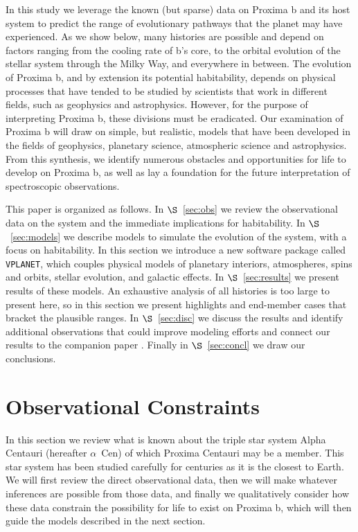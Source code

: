 \documentclass[preprint,12pt]{aastex}
\def\acen{{$\alpha$~Cen}}
\def\vplanet{\texttt{\footnotesize{VPLANET}}}
\begin{document}
In this study we leverage the known (but sparse) data on Proxima b and
its host system to predict the range of evolutionary pathways that the
planet may have experienced. As we show below, many histories are
possible and depend on factors ranging from the cooling rate of b's
core, to the orbital evolution of the stellar system through the Milky
Way, and everywhere in between. The evolution of Proxima b, and by
extension its potential habitability, depends on physical processes
that have tended to be studied by scientists that work in different
fields, such as geophysics and astrophysics. However, for the purpose
of interpreting Proxima b, these divisions must be eradicated. Our
examination of Proxima b will draw on simple, but realistic, models
that have been developed in the fields of geophysics, planetary
science, atmospheric science and astrophysics. From this synthesis, we
identify numerous obstacles and opportunities for life to develop on
Proxima b, as well as lay a foundation for the future interpretation
of spectroscopic observations.

This paper is organized as follows. In $\S$~\ref{sec:obs} we review
the observational data on the system and the immediate implications
for habitability. In $\S$~\ref{sec:models} we describe models to
simulate the evolution of the system, with a focus on habitability. In
this section we introduce a new software package called \vplanet,
which couples physical models of planetary interiors, atmospheres,
spins and orbits, stellar evolution, and galactic effects. In
$\S$~\ref{sec:results} we present results of these models. An
exhaustive analysis of all histories is too large to present here, so
in this section we present highlights and end-member cases that
bracket the plausible ranges. In $\S$~\ref{sec:disc} we discuss the
results and identify additional observations that could improve
modeling efforts and connect our results to the companion paper
\citep{Meadows16}. Finally in $\S$~\ref{sec:concl} we draw our
conclusions.

\section{Observational Constraints \label{sec:obs}}

In this section we review what is known about the triple star system
Alpha Centauri (hereafter \acen) of which Proxima Centauri may be a
member. This star system has been studied carefully for centuries as
it is the closest to Earth. We will first review the direct
observational data, then we will make whatever inferences are possible
from those data, and finally we qualitatively consider how these data
constrain the possibility for life to exist on Proxima b, which will
then guide the models described in the next section.
\end{document}

